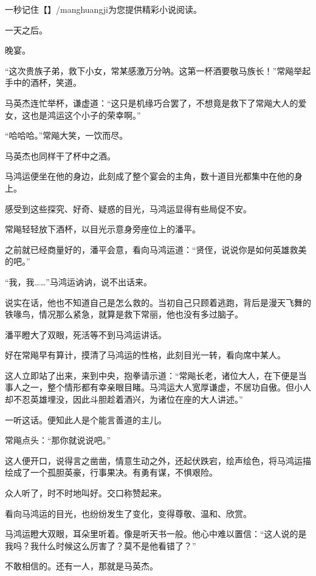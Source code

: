 
\begin{this_body}

一秒记住【】/manghuangji为您提供精彩小说阅读。

一天之后。

晚宴。

“这次贵族子弟，救下小女，常某感激万分呐。这第一杯酒要敬马族长！”常飚举起手中的酒杯，笑道。

马英杰连忙举杯，谦虚道：“这只是机缘巧合罢了，不想竟是救下了常飚大人的爱女，这也是鸿运这个小子的荣幸啊。”

“哈哈哈。”常飚大笑，一饮而尽。

马英杰也同样干了杯中之酒。

马鸿运便坐在他的身边，此刻成了整个宴会的主角，数十道目光都集中在他的身上。

感受到这些探究、好奇、疑惑的目光，马鸿运显得有些局促不安。

常飚轻轻放下酒杯，以目光示意身旁座位上的潘平。

之前就已经商量好的，潘平会意，看向马鸿运道：“贤侄，说说你是如何英雄救美的吧。”

“我，我……”马鸿运讷讷，说不出话来。

说实在话，他也不知道自己是怎么救的。当初自己只顾着逃跑，背后是漫天飞舞的铁喙鸟，情况那么紧急，就算是救下常丽，他也没有多过脑子。

潘平瞪大了双眼，死活等不到马鸿运讲话。

好在常飚早有算计，摸清了马鸿运的性格，此刻目光一转，看向席中某人。

这人立即站了出来，来到中央，抱拳请示道：“常飚长老，诸位大人，在下便是当事人之一，整个情形都有幸亲眼目睹。马鸿运大人宽厚谦虚，不居功自傲。但小人却不忍英雄埋没，因此斗胆趁着酒兴，为诸位在座的大人讲述。”

一听这话。便知此人是个能言善道的主儿。

常飚点头：“那你就说说吧。”

这人便开口，说得言之凿凿，情意生动之外，还起伏跌宕，绘声绘色，将马鸿运描绘成了一个孤胆英豪，行事果决。有勇有谋，不惧艰险。

众人听了，时不时地叫好。交口称赞起来。

看向马鸿运的目光，也纷纷发生了变化，变得尊敬、温和、欣赏。

马鸿运瞪大双眼，耳朵里听着。像是听天书一般。他心中难以置信：“这人说的是我吗？我什么时候这么厉害了？莫不是他看错了？”

不敢相信的。还有一人，那就是马英杰。


\end{this_body}

